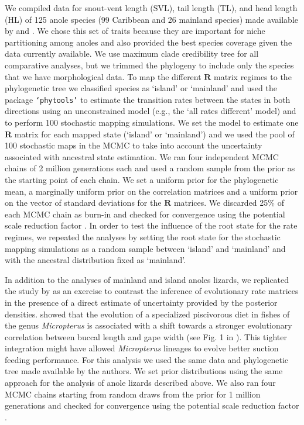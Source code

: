 We compiled data for snout-vent length (SVL), tail length (TL), and head length (HL) of 125 anole species (99 Caribbean and 26 mainland species) made available by \citet{mahler_exceptional_2013} and \citet{moreno-arias_patterns_2016}. We chose this set of traits because they are important for niche partitioning among anoles \citep{pinto_testing_2008, losos_lizards_2009, mahler_exceptional_2013} and also provided the best species coverage given the data currently available. We use \citet{gamble_anolis_2014} maximum clade credibility tree for all comparative analyses, but we trimmed the phylogeny to include only the species that we have morphological data. To map the different $\mathbf{R}$ matrix regimes to the phylogenetic tree we classified species as `island' or `mainland' and used the package \texttt{`phytools'} \citep{revell_phytools:_2012} to estimate the transition rates between the states in both directions using an unconstrained model (e.g., the `all rates different' model) and to perform 100 stochastic mapping simulations. We set the model to estimate one $\mathbf{R}$ matrix for each mapped state (`island' or `mainland') and we used the pool of 100 stochastic maps in the MCMC to take into account the uncertainty associated with ancestral state estimation. We ran four independent MCMC chains of 2 million generations each and used a random sample from the prior as the starting point of each chain. We set a uniform prior for the phylogenetic mean, a marginally uniform prior on the correlation matrices and a uniform prior on the vector of standard deviations for the $\mathbf{R}$ matrices. We discarded 25\% of each MCMC chain as burn-in and checked for convergence using the potential scale reduction factor \citep{gelman_R_1992}. In order to test the influence of the root state for the rate regimes, we repeated the analyses by setting the root state for the stochastic mapping simulations as a random sample between `island' and `mainland' and with the ancestral distribution fixed as `mainland'.

In addition to the analyses of mainland and island anoles lizards, we replicated the study by \citet{revell_phylogenetic_2009} as an exercise to contrast the inference of evolutionary rate matrices in the presence of a direct estimate of uncertainty provided by the posterior densities. \citet{revell_phylogenetic_2009} showed that the evolution of a specialized piscivorous diet in fishes of the genus \textit{Micropterus} is associated with a shift towards a stronger evolutionary correlation between buccal length and gape width (see Fig. 1 in \citealp{revell_phylogenetic_2009}). This tighter integration might have allowed \textit{Micropterus} lineages to evolve better suction feeding performance. For this analysis we used the same data and phylogenetic tree made available by the authors. We set prior distributions using the same approach for the analysis of anole lizards described above. We also ran four MCMC chains starting from random draws from the prior for 1 million generations and checked for convergence using the potential scale reduction factor \citep{gelman_R_1992}.

